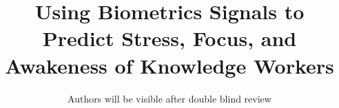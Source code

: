 \documentclass{sigchi}
\begin{document}
	
	\title{Using Biometrics Signals to Predict Stress, Focus, and Awakeness of Knowledge Workers}
	
	
	\author{Authors will be visible after double blind review\vspace{0cm}
	\vspace{18ex}}
	
	
	\begin{comment}
	
	\author{Mauricio Soto}
	\affiliation{%
	\institution{Carnegie Mellon University}
	\city{Pittsburgh}
	\state{PA}
	}
	\email{mauriciosoto@cmu.edu}
	
	\author{Chris Satterfield}
	\affiliation{%
	\institution{The University of British Columbia}
	\city{Vancouver}
	\state{British Columbia}
	}
	\email{cds00@cs.ubc.ca}
	
	\author{Thomas Fritz}
	\affiliation{%
	\institution{University of Zurich}
	\city{Zurich}
	\state{Switzerland}
	}
	\email{fritz@ifi.uzh.ch}
	
	\author{Gail C. Murphy}
	\affiliation{%
	\institution{The University of British olumbia}
	\city{Vancouver}
	\state{British Columbia}
	}
	\email{murphy@cs.ubc.ca}
	
	\author{David Shepherd}
	\affiliation{%
	\institution{ABB Corporate Research}
	\city{Raleigh}
	\state{North Carolina}
	}
	\email{david.shepherd@us.abb.com}
	
	\author{Nicholas Kraft}
	\affiliation{%
	\institution{ABB Corporate Research}
	\city{Raleigh}
	\state{North Carolina}
	}
	\email{nicholas.a.kraft@us.abb.com}
	
	\end{comment}
	
	\maketitle
	
	
\end{document}
